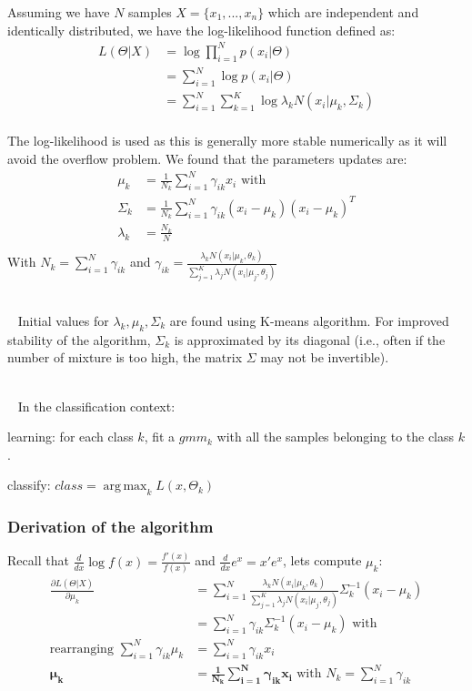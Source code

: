 \documentclass[11pt]{article}
\DeclareMathOperator*{\argmax}{arg\,max}
\begin{document}
Assuming we have $N$ samples $X=\{x_1,...,x_n\}$ which are independent and identically distributed, we have the log-likelihood function defined as:
\begin{align*}
L(\Theta | X)&=\log \prod_{i=1}^N p(x_i|\Theta) \\
&=\sum_{i=1}^N \log p(x_i|\Theta) \\
&=\sum_{i=1}^N \sum_{k=1}^K \log \lambda _k N(x_i|\mu _k, \Sigma _k) \\
\end{align*}

The log-likelihood is used as this is generally more stable numerically as it will avoid the overflow problem. We found that the parameters updates are:
\begin{align*}
\mu _ k &= \frac{1}{N_k} \sum_{i=1}^N \gamma _{ik} x_i \text{~with~} \\
\Sigma _k &= \frac{1}{N_k} \sum _{i=1}^N \gamma _{ik}(x_i-\mu _k)(x_i-\mu _k)^T \\
\lambda _k &= \frac{N_k}{N} \\
\end{align*}
With $N_k = \sum _{i=1}^N \gamma _{ik}$ and $\gamma _{ik} = \frac{\lambda_k N(x_i| \mu _k, \theta _k)}{\sum _{j=1}^K \lambda _j N(x_i| \mu _j, \theta _j)}$

~\\~
Initial values for $\lambda_k, \mu_k, \Sigma_k$ are found using K-means algorithm. For improved stability of the algorithm, $\Sigma_k$ is approximated by its diagonal (i.e., often if the number of mixture is too high, the matrix $\Sigma$ may not be invertible).

~\\~
In the classification context:
\begin{compactitem}
\item learning: for each class $k$, fit a $gmm_k$ with all the samples belonging to the class $k$.
\item classify: $class=\argmax_k L(x,\Theta_k)$
\end{compactitem}

\subsubsection{Derivation of the algorithm}
Recall that $\frac{d}{dx} \log f(x) = \frac{f'(x)}{f(x)}$ and $\frac{d}{dx} e ^x=x' e^x$, lets compute $\mu _k$:
\begin{align}
\frac{\partial L(\Theta | X)}{\partial\mu _k} &=  \sum_{i=1}^N \frac{\lambda_k N(x_i| \mu _k, \theta _k)}{\sum _{j=1}^K \lambda _j N(x_i| \mu _j, \theta _j)} \Sigma _k^{-1} (x_i-\mu _k) \nonumber\\
&=  \sum_{i=1}^N \gamma _{ik} \Sigma _k^{-1} (x_i-\mu _k) \text{~with ~} \nonumber\\
\text{rearranging~} \sum_{i=1}^N \gamma _{ik} \mu _ k &= \sum_{i=1}^N \gamma _{ik} x_i \nonumber\\
\bm{\mu _ k} &= \bm{\frac{1}{N_k} \sum_{i=1}^N \gamma _{ik} x_i} \text{~with~} N_k = \sum _{i=1}^N \gamma _{ik}
\end{align}
\end{document}
